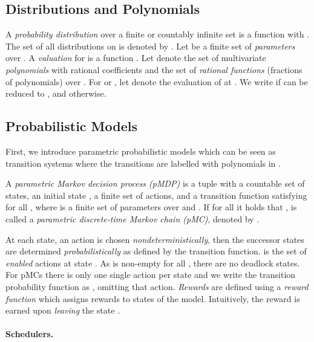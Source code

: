 \subsection{Distributions and Polynomials}

A \emph{probability distribution} over a finite or countably infinite set  is a function  with . 
The set of all distributions on  is denoted by .
Let  be a finite set of \emph{parameters} over .
A \emph{valuation} for  is a function .
Let  denote the set of multivariate \emph{polynomials} with rational coefficients and  the set of \emph{rational functions} (fractions of polynomials) over . For  or , let  denote the evaluation of  at . We write  if  can be reduced to , and  otherwise.






\subsection{Probabilistic Models}\label{sec:probmodels}

First, we introduce parametric probabilistic models which can be seen as transition systems where the transitions are labelled with polynomials in .
\begin{definition}\label{def:pmdp}
A \emph{parametric Markov decision process (pMDP)} is a tuple  with a countable set  of states, an initial state , a finite set  of actions, and a transition function  satisfying for all , where  is a finite set  of parameters over  and .
If for all  it holds that ,  is called a \emph{parametric discrete-time Markov chain (pMC)}, denoted by .
\end{definition}
At each state, an action is chosen \emph{nondeterministically}, then the successor states are determined \emph{probabilistically} as defined by the transition function.
 is the set of \emph{enabled} actions at state .
As  is non-empty for all , there are no deadlock states. For pMCs there is only one single action per state and we write the transition probability function as , omitting that action.
\emph{Rewards} are defined using a \emph{reward function}  which assigns rewards to states of the model.
Intuitively, the reward  is earned upon \emph{leaving} the state . 

\paragraph{Schedulers.}

